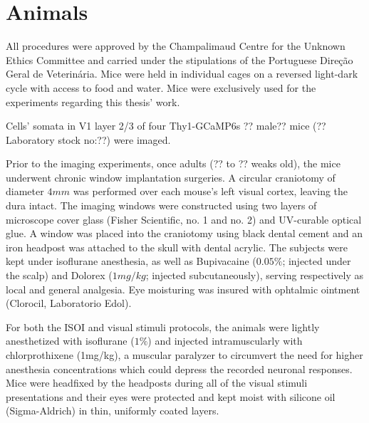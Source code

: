 \section{Animals}
\label{sec:Animals}

All procedures were approved by the Champalimaud Centre for the Unknown Ethics Committee and carried under the stipulations of the Portuguese Direção Geral de Veterinária. Mice were held in individual cages on a reversed light-dark cycle with access to food and water. Mice were exclusively used for the experiments regarding this thesis' work.

Cells' somata in V1 layer 2/3 of four Thy1-GCaMP6s ?? male?? mice (?? Laboratory stock no:??) were imaged.

Prior to the imaging experiments, once adults (?? to ?? weaks old), the mice underwent chronic window implantation surgeries. A circular craniotomy of diameter $4mm$ was performed over each mouse's left visual cortex, leaving the dura intact. The imaging windows were constructed using two layers of microscope cover glass (Fisher Scientific, no. 1 and no. 2) and UV-curable optical glue. A window was placed into the craniotomy using black dental cement and an iron headpost was attached to the skull with dental acrylic. The subjects were kept under isoflurane anesthesia, as well as Bupivacaine ($0.05\%$; injected under the scalp) and Dolorex ($1 mg/kg$; injected subcutaneously), serving respectively as local and general analgesia. Eye moisturing was insured with ophtalmic ointment (Clorocil, Laboratorio Edol).

For both the ISOI and visual stimuli protocols, the animals were lightly anesthetized with isoflurane ($1\%$) and injected intramuscularly with chlorprothixene (1mg/kg), a muscular paralyzer to circumvert the need for higher anesthesia concentrations which could depress the recorded neuronal responses. Mice were headfixed by the headposts during all of the visual stimuli presentations and their eyes were protected and kept moist with silicone oil (Sigma-Aldrich) in thin, uniformly coated layers.
